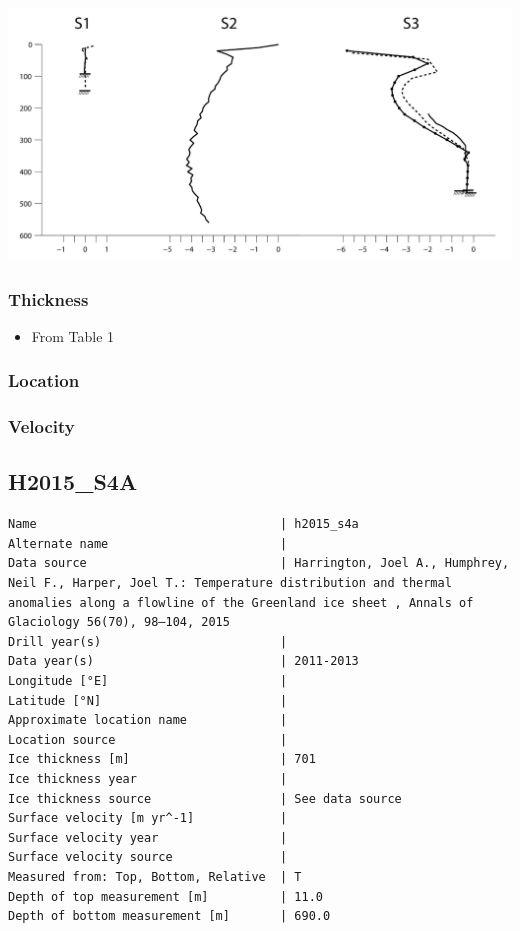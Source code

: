 \documentclass[article,a4paper,times,11pt,twoside]{article}
\begin{document}
\begin{center}
\includegraphics[width=.9\linewidth]{h2015_s3c/harrington_2015_fig2_S1_S2_S3.png}
\end{center}

\subsubsection{Thickness}
\label{sec:org534c304}

\begin{itemize}
\item From \textcite{harrington_2015} Table 1
\end{itemize}

\subsubsection{Location}
\label{sec:orgafc1434}

\subsubsection{Velocity}
\label{sec:org91b8213}
\clearpage
\subsection{H2015\_S4A}
\label{sec:org1dd6c6b}
\begin{verbatim}
Name                                  | h2015_s4a
Alternate name                        | 
Data source                           | Harrington, Joel A., Humphrey, Neil F., Harper, Joel T.: Temperature distribution and thermal anomalies along a flowline of the Greenland ice sheet , Annals of Glaciology 56(70), 98–104, 2015 
Drill year(s)                         | 
Data year(s)                          | 2011-2013
Longitude [°E]                        | 
Latitude [°N]                         | 
Approximate location name             | 
Location source                       | 
Ice thickness [m]                     | 701
Ice thickness year                    | 
Ice thickness source                  | See data source
Surface velocity [m yr^-1]            | 
Surface velocity year                 | 
Surface velocity source               | 
Measured from: Top, Bottom, Relative  | T
Depth of top measurement [m]          | 11.0
Depth of bottom measurement [m]       | 690.0
\end{verbatim}
\end{document}
